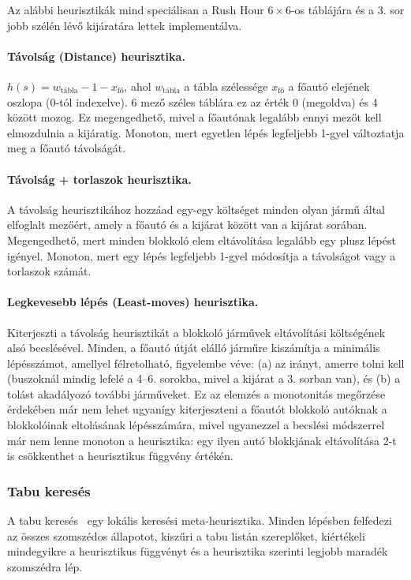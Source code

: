 Az alábbi heurisztikák mind speciálisan a Rush Hour $6 \times 6$-os táblájára és a 3. sor jobb szélén lévő kijáratára lettek implementálva. 

\paragraph{Távolság (Distance) heurisztika.} $h(s) = w_{\text{tábla}} - 1 - x_{\text{fő}}$, ahol $w_{\text{tábla}}$ a tábla szélessége $x_{\text{fő}}$ a főautó elejének oszlopa (0-tól indexelve). 6 mező széles táblára ez az érték 0 (megoldva) és 4 között mozog. Ez megengedhető, mivel a főautónak legalább ennyi mezőt kell elmozdulnia a kijáratig. Monoton, mert egyetlen lépés legfeljebb 1-gyel változtatja meg a főautó távolságát.

\paragraph{Távolság + torlaszok heurisztika.} A távolság heurisztikához hozzáad egy-egy költséget minden olyan jármű által elfoglalt mezőért, amely a főautó és a kijárat között van a kijárat sorában. Megengedhető, mert minden blokkoló elem eltávolítása legalább egy plusz lépést igényel. Monoton, mert egy lépés legfeljebb 1-gyel módosítja a távolságot vagy a torlaszok számát.

\paragraph{Legkevesebb lépés (Least-moves) heurisztika.} Kiterjeszti a távolság heurisztikát a blokkoló járművek eltávolítási költségének alsó becslésével. Minden, a főautó útját elálló járműre kiszámítja a minimális lépésszámot, amellyel félretolható, figyelembe véve: (a) az irányt, amerre tolni kell (buszoknál mindig lefelé a 4–6. sorokba, mivel a kijárat a 3. sorban van), és (b) a tolást akadályozó további járműveket. Ez az elemzés a monotonitás megőrzése érdekében már nem lehet ugyanígy kiterjeszteni a főautót blokkoló autóknak a blokkolóinak eltolásának lépésszámára, mivel ugyanezzel a becslési módszerrel már nem lenne monoton a heurisztika: egy ilyen autó blokkjának eltávolítása 2-t is csökkenthet a heurisztikus függvény értékén. 

\subsubsection{Tabu keresés}
\label{sec:tabu}

A tabu keresés~\cite{glover1989tabu} egy lokális keresési meta-heurisztika. Minden lépésben felfedezi az összes szomszédos állapotot, kiszűri a tabu listán szereplőket, kiértékeli mindegyikre a heurisztikus függvényt és a heurisztika szerinti legjobb maradék szomszédra lép.


